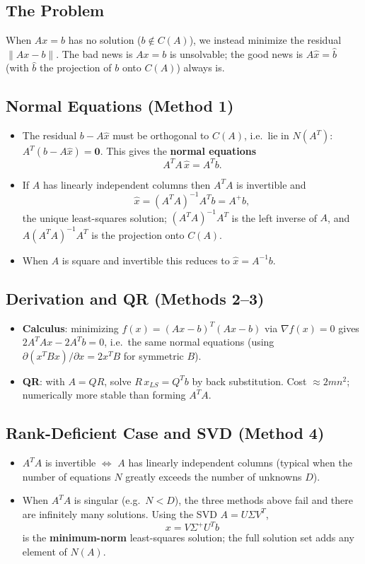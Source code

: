 \documentclass[hidelinks]{article}
\begin{document}
\subsection{The Problem}
When $Ax=b$ has no solution ($b\notin C(A)$), we instead minimize the residual $\|Ax-b\|$. The bad news is $Ax=b$ is unsolvable; the good news is $A\hat x = \hat b$ (with $\hat b$ the projection of $b$ onto $C(A)$) always is.

\subsection{Normal Equations (Method 1)}
\begin{itemize}
    \item The residual $b-A\hat x$ must be orthogonal to $C(A)$, i.e.\ lie in $N(A^T)$: $A^T(b-A\hat x)=\mathbf 0$. This gives the \textbf{normal equations}
    \[
        A^TA\,\hat x = A^Tb.
    \]
    \item If $A$ has linearly independent columns then $A^TA$ is invertible and
    \[
        \hat x = (A^TA)^{-1}A^Tb = A^{+}b,
    \]
    the unique least-squares solution; $(A^TA)^{-1}A^T$ is the left inverse of $A$, and $A(A^TA)^{-1}A^T$ is the projection onto $C(A)$.
    \item When $A$ is square and invertible this reduces to $\hat x = A^{-1}b$.
\end{itemize}

\subsection{Derivation and QR (Methods 2--3)}
\begin{itemize}
    \item \textbf{Calculus}: minimizing $f(x) = (Ax-b)^T(Ax-b)$ via $\nabla f(x) = 0$ gives $2A^TAx - 2A^Tb = 0$, i.e.\ the same normal equations (using $\partial(x^TBx)/\partial x = 2x^TB$ for symmetric $B$).
    \item \textbf{QR}: with $A = QR$, solve $R\,x_{LS} = Q^Tb$ by back substitution. Cost $\approx 2mn^2$; numerically more stable than forming $A^TA$.
\end{itemize}

\subsection{Rank-Deficient Case and SVD (Method 4)}
\begin{itemize}
    \item $A^TA$ is invertible $\iff$ $A$ has linearly independent columns (typical when the number of equations $N$ greatly exceeds the number of unknowns $D$).
    \item When $A^TA$ is singular (e.g.\ $N < D$), the three methods above fail and there are infinitely many solutions. Using the SVD $A = U\Sigma V^T$,
    \[
        x = V\Sigma^{+}U^Tb
    \]
    is the \textbf{minimum-norm} least-squares solution; the full solution set adds any element of $N(A)$.
\end{itemize}
\end{document}
